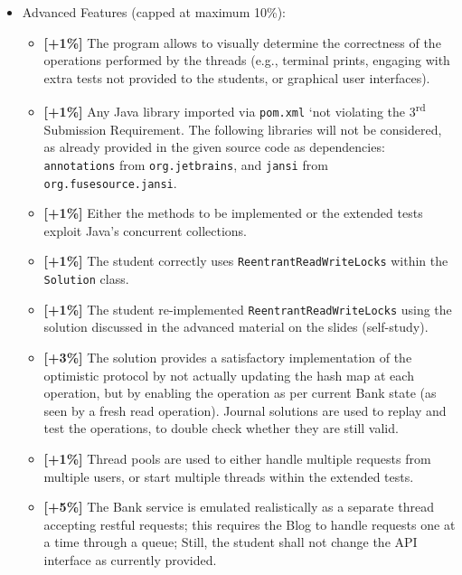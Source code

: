 \documentclass{article}
\begin{document}
\begin{itemize}
\item  Advanced Features (capped at maximum 10\%):
\begin{itemize}
	\item \textbf{[+1\%]} The program allows to visually determine the correctness of the operations performed by the threads (e.g., terminal prints, engaging with extra tests not provided to the students, or graphical user interfaces).
	\item \textbf{[+1\%]} Any Java library imported via \texttt{pom.xml} `not violating the 3\textsuperscript{rd} Submission Requirement. The following libraries will not be considered, as already provided in the given source code as dependencies: \texttt{annotations} from \texttt{org.jetbrains}, and \texttt{jansi} from \texttt{org.fusesource\-.jansi}.
	\item  \textbf{[+1\%]} Either the methods to be implemented or the extended tests exploit Java's concurrent collections.
\item \textbf{[+1\%]} The student correctly uses \texttt{ReentrantReadWriteLocks} within the \texttt{Solution} class.
\item \textbf{[+1\%]} The student re-implemented \texttt{ReentrantReadWriteLocks} using the solution discussed in the advanced material on the slides (self-study).
\item \textbf{[+3\%]} The solution provides a satisfactory implementation of the optimistic protocol by not actually updating the hash map at each operation, but by enabling the operation as per current Bank state (as seen by a fresh read operation). Journal solutions are used to replay and test the operations, to double check whether they are still valid.
	\item \textbf{[+1\%]} Thread pools are used to either handle multiple requests from multiple users, or start multiple threads within the extended tests.
	\item  \textbf{[+5\%]} The Bank service is emulated realistically as a separate thread accepting restful requests; this requires the Blog to handle requests one at a time through a queue; Still, the student shall not change the API interface as currently provided.








\end{itemize}
	\end{itemize}


	
\end{document}
